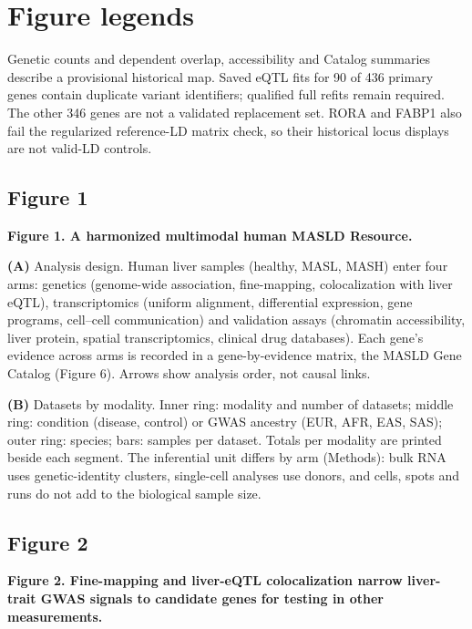 \section{Figure legends}\label{figure-legends}

Genetic counts and dependent overlap, accessibility and Catalog summaries
describe a provisional historical map. Saved eQTL fits for 90 of 436 primary
genes contain duplicate variant identifiers; qualified full refits remain
required. The other 346 genes are not a validated replacement set. RORA and
FABP1 also fail the regularized reference-LD matrix check, so their historical
locus displays are not valid-LD controls.

\subsection{Figure 1}\label{figure-1}

\textbf{Figure 1. A harmonized multimodal human MASLD Resource.}

\textbf{(A)} Analysis design. Human liver samples (healthy, MASL, MASH) enter four arms: genetics (genome-wide association, fine-mapping, colocalization with liver eQTL), transcriptomics (uniform alignment, differential expression, gene programs, cell--cell communication) and validation assays (chromatin accessibility, liver protein, spatial transcriptomics, clinical drug databases). Each gene's evidence across arms is recorded in a gene-by-evidence matrix, the MASLD Gene Catalog (Figure 6). Arrows show analysis order, not causal links.

\textbf{(B)} Datasets by modality. Inner ring: modality and number of datasets; middle ring: condition (disease, control) or GWAS ancestry (EUR, AFR, EAS, SAS); outer ring: species; bars: samples per dataset. Totals per modality are printed beside each segment. The inferential unit differs by arm (Methods): bulk RNA uses genetic-identity clusters, single-cell analyses use donors, and cells, spots and runs do not add to the biological sample size.

\subsection{Figure 2}\label{figure-2}

\textbf{Figure 2. Fine-mapping and liver-eQTL colocalization narrow liver-trait GWAS signals to candidate genes for testing in other measurements.}

